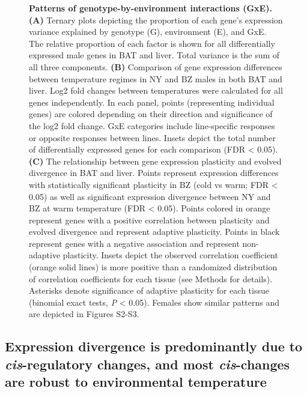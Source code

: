 \documentclass[9pt,twocolumn,twoside,lineno]{pnas-new}
\begin{document}
\begin{figure}[!t]
  \caption{\textbf{Patterns of genotype-by-environment interactions (GxE). (A)} Ternary plots depicting the proportion of each gene’s expression variance explained by genotype (G), environment (E), and GxE. The relative proportion of each factor is shown for all differentially expressed male genes in BAT and liver. Total variance is the sum of all three components. \textbf{(B)} Comparison of gene expression differences between temperature regimes in NY and BZ males in both BAT and liver. Log2 fold changes between temperatures were calculated for all genes independently. In each panel, points (representing individual genes) are colored depending on their direction and significance of the log2 fold change. GxE categories include line-specific responses or opposite responses between lines. Insets depict the total number of differentially expressed genes for each comparison (FDR < 0.05). \textbf{(C)} The relationship between gene expression plasticity and evolved divergence in BAT and liver. Points represent expression differences with statistically significant plasticity in BZ (cold vs warm; FDR < 0.05) as well as significant expression divergence between NY and BZ at warm temperature (FDR < 0.05). Points colored in orange represent genes with a positive correlation between plasticity and evolved divergence and represent adaptive plasticity. Points in black represent genes with a negative association and represent non-adaptive plasticity. Insets depict the observed correlation coefficient (orange solid lines) is more positive than a randomized distribution of correlation coefficients for each tissue (see Methods for details). Asterisks denote significance of adaptive plasticity for each tissue (binomial exact tests, \textit{P} < 0.05). Females show similar patterns and are depicted in Figures S2-S3.}
\end{figure}

\hypertarget{expression-divergence-is-predominantly-due-to-cis-regulatory-changes-and-most-cis-changes-are-robust-to-environmental-temperature}{%
\subsection*{\texorpdfstring{Expression divergence is predominantly due
to \emph{cis}-regulatory changes, and most \emph{cis}-changes are robust
to environmental
temperature}{Expression divergence is predominantly due to cis-regulatory changes, and most cis-changes are robust to environmental temperature}}\label{expression-divergence-is-predominantly-due-to-cis-regulatory-changes-and-most-cis-changes-are-robust-to-environmental-temperature}}
\end{document}
